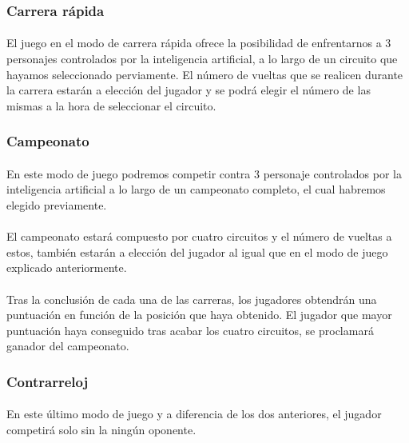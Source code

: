 \subsubsection{Carrera rápida} 

\paragraph{}
El juego en el modo de carrera rápida ofrece la posibilidad de enfrentarnos a 3 personajes 
controlados por la inteligencia artificial, a lo largo de un circuito que hayamos seleccionado perviamente. El número de vueltas
que se realicen durante la carrera estarán a elección del jugador y se podrá elegir el número de las mismas a la hora de seleccionar
el circuito.

\subsubsection{Campeonato} 

\paragraph{}
En este modo de juego podremos competir contra 3 personaje controlados por la inteligencia artificial 
a lo largo de un campeonato completo, el cual habremos elegido previamente. 

\paragraph{}
El campeonato estará compuesto por cuatro circuitos y el número de vueltas a estos, también estarán a elección del jugador 
al igual que en el modo de juego explicado anteriormente.

\paragraph{}
Tras la conclusión de cada una de las carreras, los jugadores obtendrán una puntuación en función de la posición que haya 
obtenido. El jugador que mayor puntuación haya conseguido tras acabar los cuatro circuitos, se proclamará ganador del 
campeonato.

\subsubsection{Contrarreloj} 

\paragraph{}
En este último modo de juego y a diferencia de los dos anteriores, el jugador competirá solo sin la ningún oponente.

